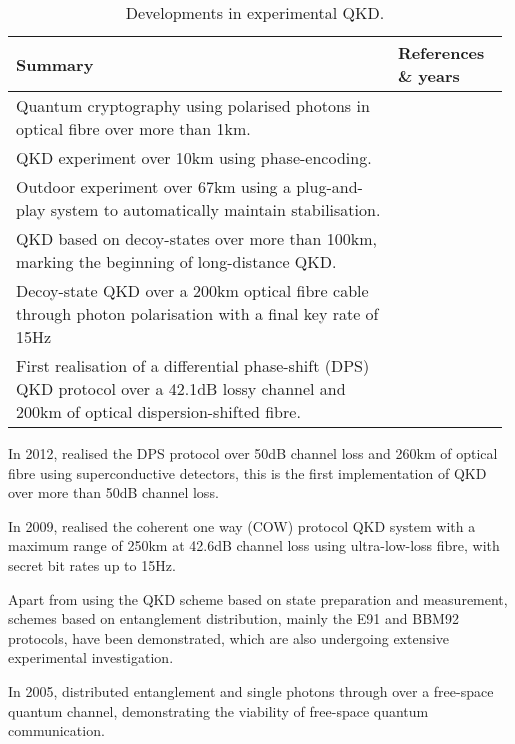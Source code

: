 \begin{table*}[!htbp]
\caption{Developments in experimental QKD.} \label{tab:QKD_table}
\begin{tabular}{|p{0.755\linewidth}|p{0.22\linewidth}|}
	\hline
	Summary & References \& years \\
	\hline \hline
	Quantum cryptography using polarised photons in optical fibre over more than 1km. & \cite{bib:EL_23_383} \\
	\hline
	QKD experiment over 10km using phase-encoding. & \cite{bib:EL_29_634} \\
	\hline
	Outdoor experiment over 67km using a plug-and-play system to automatically maintain stabilisation. & \cite{bib:Arx0203118} \\
	\hline
	QKD based on decoy-states over more than 100km, marking the beginning of long-distance QKD. & \cite{bib:PRL_98_010505, bib:PRL_09_010503x, bib:PRL_98_010504} \\
	\hline
	Decoy-state QKD over a 200km optical fibre cable through photon polarisation with a final key rate of 15Hz & \cite{bib:OptExp_18_8587} \\
	\hline
	First realisation of a differential phase-shift (DPS) QKD protocol over a 42.1dB lossy channel and 200km of optical dispersion-shifted fibre. & \cite{bib:NP_1_343} \\
	\hline
\end{tabular}
\end{table*}


In 2012, \cite{bib:OL_37_1008} realised the DPS protocol over 50dB channel loss and 260km of optical fibre using superconductive detectors, this is the first implementation of QKD over more than 50dB channel loss.

In 2009, \cite{bib:NJP_11_075003} realised the coherent one way (COW) protocol QKD system with a maximum range of 250km at 42.6dB channel loss using ultra-low-loss fibre, with secret bit rates up to 15Hz.
 
Apart from using the QKD scheme based on state preparation and measurement, schemes based on entanglement distribution, mainly the E91 \cite{bib:PRL_67_661} and BBM92 \cite{bib:PRL_68_557} protocols, have been demonstrated, which are also undergoing extensive experimental investigation.

In 2005, \cite{bib:OE_13_202} distributed entanglement and single photons through over a free-space quantum channel, demonstrating the viability of free-space quantum communication. 

